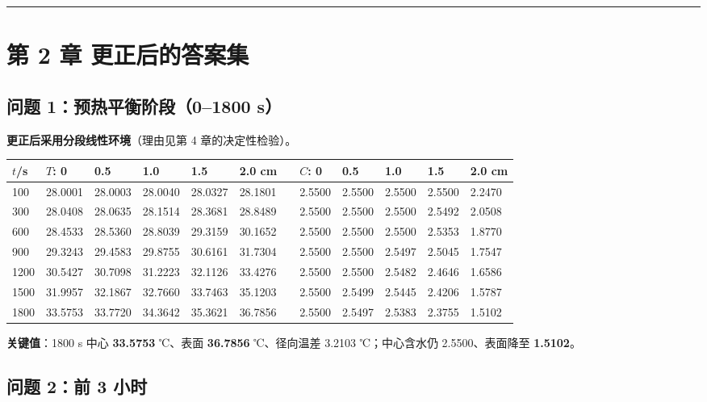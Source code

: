 \vspace{1mm}\hrule\vspace{1mm}


\section{第 2 章 更正后的答案集}


\subsection{问题 1：预热平衡阶段（0–1800 s）}


\textbf{更正后采用分段线性环境}（理由见第 4 章的决定性检验）。


\begin{center}
\small
\begin{tabular}{llllllllllll}
\toprule
$t$/s & $T$: 0 & 0.5 & 1.0 & 1.5 & 2.0 cm &  & $C$: 0 & 0.5 & 1.0 & 1.5 & 2.0 cm \\
\midrule
100 & 28.0001 & 28.0003 & 28.0040 & 28.0327 & 28.1801 &  & 2.5500 & 2.5500 & 2.5500 & 2.5500 & 2.2470 \\
300 & 28.0408 & 28.0635 & 28.1514 & 28.3681 & 28.8489 &  & 2.5500 & 2.5500 & 2.5500 & 2.5492 & 2.0508 \\
600 & 28.4533 & 28.5360 & 28.8039 & 29.3159 & 30.1652 &  & 2.5500 & 2.5500 & 2.5500 & 2.5353 & 1.8770 \\
900 & 29.3243 & 29.4583 & 29.8755 & 30.6161 & 31.7304 &  & 2.5500 & 2.5500 & 2.5497 & 2.5045 & 1.7547 \\
1200 & 30.5427 & 30.7098 & 31.2223 & 32.1126 & 33.4276 &  & 2.5500 & 2.5500 & 2.5482 & 2.4646 & 1.6586 \\
1500 & 31.9957 & 32.1867 & 32.7660 & 33.7463 & 35.1203 &  & 2.5500 & 2.5499 & 2.5445 & 2.4206 & 1.5787 \\
1800 & 33.5753 & 33.7720 & 34.3642 & 35.3621 & 36.7856 &  & 2.5500 & 2.5497 & 2.5383 & 2.3755 & 1.5102 \\
\bottomrule
\end{tabular}
\end{center}


\textbf{关键值}：1800 s 中心 \textbf{33.5753} ℃、表面 \textbf{36.7856} ℃、径向温差 3.2103 ℃；中心含水仍 2.5500、表面降至 \textbf{1.5102}。


\subsection{问题 2：前 3 小时}


